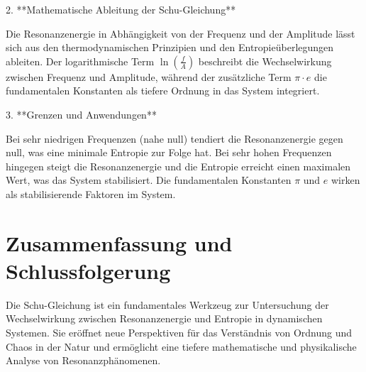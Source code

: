 \documentclass{article}
\begin{document}
	2. **Mathematische Ableitung der Schu-Gleichung**
	
	Die Resonanzenergie in Abhängigkeit von der Frequenz und der Amplitude lässt sich aus den thermodynamischen Prinzipien und den Entropieüberlegungen ableiten. Der logarithmische Term \( \ln\left(\frac{f}{A}\right) \) beschreibt die Wechselwirkung zwischen Frequenz und Amplitude, während der zusätzliche Term \( \pi \cdot e \) die fundamentalen Konstanten als tiefere Ordnung in das System integriert.
	
	3. **Grenzen und Anwendungen**
	
	Bei sehr niedrigen Frequenzen (nahe null) tendiert die Resonanzenergie gegen null, was eine minimale Entropie zur Folge hat. Bei sehr hohen Frequenzen hingegen steigt die Resonanzenergie und die Entropie erreicht einen maximalen Wert, was das System stabilisiert. Die fundamentalen Konstanten \( \pi \) und \( e \) wirken als stabilisierende Faktoren im System.
	
	\section*{Zusammenfassung und Schlussfolgerung}
	
	Die Schu-Gleichung ist ein fundamentales Werkzeug zur Untersuchung der Wechselwirkung zwischen Resonanzenergie und Entropie in dynamischen Systemen. Sie eröffnet neue Perspektiven für das Verständnis von Ordnung und Chaos in der Natur und ermöglicht eine tiefere mathematische und physikalische Analyse von Resonanzphänomenen.
	
\end{document}
